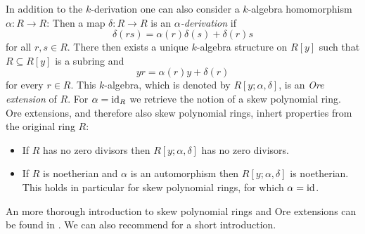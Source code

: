 \begin{remark}
  In addition to the $k$-derivation one can also consider a $k$-algebra homomorphism $\alpha \colon R \to R$:
  Then a map $\delta \colon R \to R$ is an \emph{$\alpha$-derivation} if
  \[
      \delta(rs)
    = \alpha(r) \delta(s) + \delta(r) s
  \]
  for all $r, s \in R$.
  There then exists a unique $k$-algebra structure on $R[y]$ such that $R \subseteq R[y]$ is a subring and
  \[
      y r
    = \alpha(r) y + \delta(r)
  \]
  for every $r \in R$.
  This $k$-algebra, which is denoted by $R[y;\alpha,\delta]$, is an \emph{Ore extension} of $R$.
  For $\alpha = \operatorname{id}_R$ we retrieve the notion of a skew polynomial ring.
  Ore extensions, and therefore also skew polynomial rings, inhert properties from the original ring $R$:
  \begin{itemize}
    \item
      If $R$ has no zero divisors then $R[y;\alpha,\delta]$ has no zero divisors.
    \item
      If $R$ is noetherian and $\alpha$ is an automorphism then $R[y;\alpha,\delta]$ is noetherian.
      This holds in particular for skew polynomial rings, for which $\alpha = \operatorname{id}$.
  \end{itemize}
  
  An more thorough introduction to skew polynomial rings and Ore extensions can be found in \cite[\S~3]{NoncommutativeNoetherian}. We can also recommend \cite[\S 1]{Lam1991First} for a short introduction.
\end{remark}


